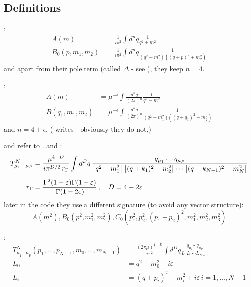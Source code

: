 \subsection{Definitions}
\cite{Passarino:1978jh}:
\begin{align}
A(m) &= \frac 1 {i\pi^2}\int d^nq\frac 1 {q^2+m^2}\\
B_0(p,m_1,m_2) &= \frac 1 {i\pi^2}\int d^nq\frac 1 {(q^2+m_1^2)((q+p)^2+m_2^2)}
\end{align}
and apart from their pole term (called $\Delta$ - see \cite[eq. D.1]{Passarino:1978jh}), they keep $n=4$.

\cite{PhysRevD4054,Bojak:2000eu}:
\begin{align}
A(m) &= \mu^{-\epsilon}\int\frac{d^nq}{(2\pi)^n} \frac 1 {q^2-m^2}\\
B(q_1,m_1,m_2) &= \mu^{-\epsilon}\int\frac{d^nq}{(2\pi)^n} \frac 1 {(q^2-m_1^2)((q+q_1)^2-m_2^2)}
\end{align}
and $n=4+\epsilon$. (\cite{PhysRevD4054} writes  - obviously they do not.)

\HEPMath\cite{wiebusch_hepmath_2015} and \FeynCalc\cite{Mertig:1990an,Shtabovenko:2016sxi} refer to \LoopTools\cite{Hahn:1998yk,LoopTools212Guide}. \cite[eq. (1.1)]{LoopTools212Guide} and \cite[eq. (2.6)]{Ellis:2011cr}:
\begin{align}
T_{\mu_1\ldots\mu_P}^N &=
\frac{\mu^{4 - D}}{i\pi^{D/2}\,r_\Gamma}
\int d^Dq\,
\frac{q_{\mu_1}\cdots q_{\mu_P}}
  {\bigl[q^2 - m_1^2\bigr]\,
   \bigl[(q + k_1)^2 - m_2^2\bigr] \cdots
   \bigl[(q + k_{N - 1})^2 - m_N^2\bigr]} \\[1ex]
\notag
r_\Gamma &= \frac{\Gamma^2(1 - \varepsilon)\Gamma(1+\varepsilon)}
  {\Gamma(1 - 2\varepsilon)}\,,
\quad D = 4 - 2\varepsilon\,
\end{align}
later in the code they use a different signature (to avoid any vector structure):
\begin{equation}
A(m^2), B_0(p^2,m_1^2,m_2^2), C_0(p_1^2,p_2^2,(p_1+p_2)^2,m_1^2,m_2^2,m_3^2)
\end{equation}

\cite{Denner:2005nn}:
\begin{align}
T_{\mu_1\ldots\mu_P}^N(p_1,\ldots,p_{N-1},m_0,\ldots,m_{N-1}) &= \frac{(2\pi\mu)^{4-D}}{i\pi^2}\int d^Dq \frac{q_{\mu_1}\cdots q_{\mu_P}}{L_0 L_1 \cdots L_{N-1}}\\
L_0 &= q^2-m_0^2 +i\varepsilon\\
L_i &= (q+p_i)^2-m_i^2+i\varepsilon \, i=1,\ldots,N-1
\end{align}

